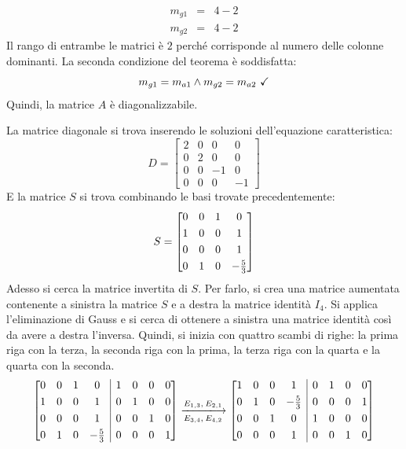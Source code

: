 \documentclass[a4paper]{article}
\makeatletter
\newenvironment{rowequmatbra}[1]{\left[\array{@{}#1@{}}}{\endarray\right]}
\makeatother
\begin{document}
	\begin{equation*}
		\begin{array}{lll}
			m_{g1} &=& 4 - 2 \\
			m_{g2} &=& 4 - 2
		\end{array}
	\end{equation*}
	Il rango di entrambe le matrici è $2$ perché corrisponde al numero delle colonne dominanti. La seconda condizione del teorema è soddisfatta:
	\begin{equation*}
		m_{g1} = m_{a1} \land m_{g2} = m_{a2} \text{ \checkmark}
	\end{equation*}
	Quindi, la matrice $A$ è diagonalizzabile.\newpage
	
	\noindent
	La matrice diagonale si trova inserendo le soluzioni dell'equazione caratteristica:
	\begin{equation*}
		D = \begin{bmatrix}
			2 & 0 & 0 & 0 \\
			0 & 2 & 0 & 0 \\
			0 & 0 & -1 & 0 \\
			0 & 0 & 0 & -1
		\end{bmatrix}
	\end{equation*}
	E la matrice $S$ si trova combinando le basi trovate precedentemente:
	\begin{equation*}
		S = \begin{rowequmatbra}{cccc}
			0 & 0 & 1 & 0 \\ [0.3em]
			1 & 0 & 0 & 1 \\ [0.3em]
			0 & 0 & 0 & 1 \\ [0.3em]
			0 & 1 & 0 & -\frac{5}{3}
		\end{rowequmatbra}
	\end{equation*}
	Adesso si cerca la matrice invertita di $S$. Per farlo, si crea una matrice aumentata contenente a sinistra la matrice $S$ e a destra la matrice identità $I_{4}$. Si applica l'eliminazione di Gauss e si cerca di ottenere a sinistra una matrice identità così da avere a destra l'inversa. Quindi, si inizia con quattro scambi di righe: la prima riga con la terza, la seconda riga con la prima, la terza riga con la quarta e la quarta con la seconda.
	\begin{equation*}
		\begin{rowequmatbra}{cccc|cccc}
			0 & 0 & 1 & 0 & 1 & 0 & 0 & 0 \\ [0.3em]
			1 & 0 & 0 & 1 & 0 & 1 & 0 & 0 \\ [0.3em]
			0 & 0 & 0 & 1 & 0 & 0 & 1 & 0 \\ [0.3em]
			0 & 1 & 0 & -\frac{5}{3} & 0 & 0 & 0 & 1 
		\end{rowequmatbra}
		\xlongrightarrow[E_{3,4}, \: E_{4,2}]{E_{1,3}, \: E_{2,1}}
		\begin{rowequmatbra}{cccc|cccc}
			1 & 0 & 0 & 1 & 0 & 1 & 0 & 0 \\ [0.3em]
			0 & 1 & 0 & -\frac{5}{3} & 0 & 0 & 0 & 1 \\ [0.3em]
			0 & 0 & 1 & 0 & 1 & 0 & 0 & 0 \\ [0.3em]
			0 & 0 & 0 & 1 & 0 & 0 & 1 & 0
		\end{rowequmatbra}
	\end{equation*}
\end{document}
